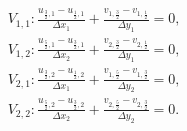 \documentclass{article}
\numberwithin{equation}{section}
\begin{document}

$$
\begin{aligned}
& V_{1,1}: \frac{u_{\frac{3}{2},1}-u_{\frac{1}{2},1}}{\Delta x_1}+\frac{v_{1,\frac{3}{2}}-v_{1,\frac{1}{2}}}{\Delta y_1}=0, \\
& V_{1,2}: \frac{u_{\frac{5}{2},1}-u_{\frac{3}{2},1}}{\Delta x_2}+\frac{v_{2,\frac{3}{2}}-v_{2,\frac{1}{2}}}{\Delta y_1}=0, \\
& V_{2,1}: \frac{u_{\frac{3}{2},2}-u_{\frac{1}{2},2}}{\Delta x_1}+\frac{v_{1,\frac{5}{2}}-v_{1,\frac{3}{2}}}{\Delta y_2}=0, \\
& V_{2,2}: \frac{u_{\frac{5}{2},2}-u_{\frac{3}{2},2}}{\Delta x_2}+\frac{v_{2,\frac{5}{2}}-v_{2,\frac{3}{2}}}{\Delta y_2}=0 .
\end{aligned}
$$
\end{document}
